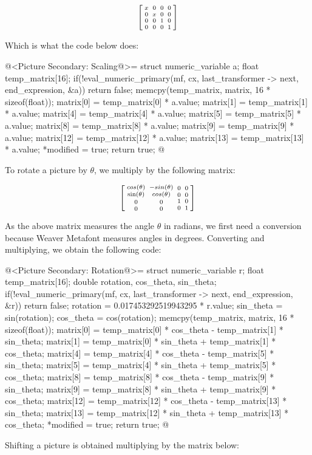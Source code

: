 $$\left[{{x \atop 0}\atop {0\atop
      0}}{{0 \atop x}\atop {0 \atop 0}}{{0\atop 0}\atop{1 \atop
      0}}{{0 \atop 0}\atop{0\atop 1}}\right]
$$

Which is what the code below does:

\iniciocodigo
@<Picture Secondary: Scaling@>=
struct numeric_variable a;
float temp_matrix[16];
if(!eval_numeric_primary(mf, cx, last_transformer -> next, end_expression, &a))
  return false;
memcpy(temp_matrix, matrix, 16 * sizeof(float));
matrix[0] = temp_matrix[0] * a.value;
matrix[1] = temp_matrix[1] * a.value;
matrix[4] = temp_matrix[4] * a.value;
matrix[5] = temp_matrix[5] * a.value;
matrix[8] = temp_matrix[8] * a.value;
matrix[9] = temp_matrix[9] * a.value;
matrix[12] = temp_matrix[12] * a.value;
matrix[13] = temp_matrix[13] * a.value;
*modified = true;
return true;
@
\fimcodigo

To rotate a picture by $\theta$, we multiply by the following matrix:

$$\left[{{cos(\theta) \atop \sin(\theta)}\atop
      {0\atop 0}}{{-sin(\theta) \atop cos(\theta)}\atop {0 \atop
      0}}{{0\atop 0}\atop{1 \atop 0}}{{0 \atop 0}\atop{0\atop
      1}}\right]
$$

As the above matrix measures the angle $\theta$ in radians, we first
need a conversion because Weaver Metafont measures angles in
degrees. Converting and multiplying, we obtain the following code:

\iniciocodigo
@<Picture Secondary: Rotation@>=
struct numeric_variable r;
float temp_matrix[16];
double rotation, cos_theta, sin_theta;
if(!eval_numeric_primary(mf, cx, last_transformer -> next, end_expression, &r))
  return false;
rotation = 0.017453292519943295 * r.value;
sin_theta = sin(rotation);
cos_theta = cos(rotation);
memcpy(temp_matrix, matrix, 16 * sizeof(float));
matrix[0] = temp_matrix[0] * cos_theta - temp_matrix[1] * sin_theta;
matrix[1] = temp_matrix[0] * sin_theta + temp_matrix[1] * cos_theta;
matrix[4] = temp_matrix[4] * cos_theta - temp_matrix[5] * sin_theta;
matrix[5] = temp_matrix[4] * sin_theta + temp_matrix[5] * cos_theta;
matrix[8] = temp_matrix[8] * cos_theta - temp_matrix[9] * sin_theta;
matrix[9] = temp_matrix[8] * sin_theta + temp_matrix[9] * cos_theta;
matrix[12] = temp_matrix[12] * cos_theta - temp_matrix[13] * sin_theta;
matrix[13] = temp_matrix[12] * sin_theta + temp_matrix[13] * cos_theta;
*modified = true;
return true;
@
\fimcodigo

Shifting a picture is obtained multiplying by the matrix below:

